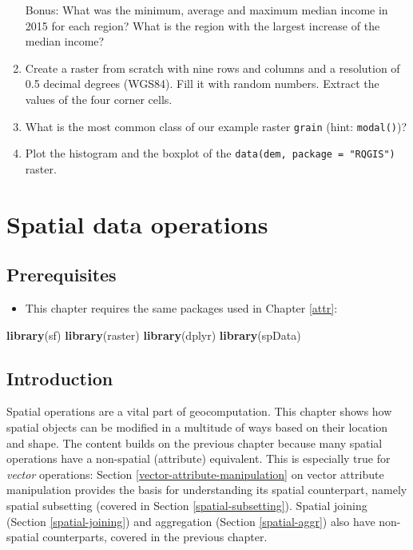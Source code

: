 \documentclass[]{krantz}
\newenvironment{Shaded}{\begin{snugshade}}{\end{snugshade}}
\newcommand{\KeywordTok}[1]{\textcolor[rgb]{0.27,0.27,0.27}{\textbf{#1}}}
\newcommand{\NormalTok}[1]{#1}
\providecommand{\tightlist}{%
  \setlength{\itemsep}{0pt}\setlength{\parskip}{0pt}}
\begin{document}
\begin{enumerate}
  Bonus: What was the minimum, average and maximum median income in 2015 for each region?
  What is the region with the largest increase of the median income?
\item
  Create a raster from scratch with nine rows and columns and a resolution of 0.5 decimal degrees (WGS84).
  Fill it with random numbers.
  Extract the values of the four corner cells.
\item
  What is the most common class of our example raster \texttt{grain} (hint: \texttt{modal()})?
\item
  Plot the histogram and the boxplot of the \texttt{data(dem,\ package\ =\ "RQGIS")} raster.
\end{enumerate}

\hypertarget{spatial-operations}{%
\section{Spatial data operations}\label{spatial-operations}}

\hypertarget{prerequisites-2}{%
\subsection*{Prerequisites}\label{prerequisites-2}}

\begin{itemize}
\tightlist
\item
  This chapter requires the same packages used in Chapter \ref{attr}:
\end{itemize}

\begin{Shaded}
\begin{Highlighting}[]
\KeywordTok{library}\NormalTok{(sf)}
\KeywordTok{library}\NormalTok{(raster)}
\KeywordTok{library}\NormalTok{(dplyr)}
\KeywordTok{library}\NormalTok{(spData)}
\end{Highlighting}
\end{Shaded}

\hypertarget{introduction-1}{%
\subsection{Introduction}\label{introduction-1}}

Spatial operations are a vital part of geocomputation.
This chapter shows how spatial objects can be modified in a multitude of ways based on their location and shape.
The content builds on the previous chapter because many spatial operations have a non-spatial (attribute) equivalent.
This is especially true for \emph{vector} operations: Section \ref{vector-attribute-manipulation} on vector attribute manipulation provides the basis for understanding its spatial counterpart, namely spatial subsetting (covered in Section \ref{spatial-subsetting}).
Spatial joining (Section \ref{spatial-joining}) and aggregation (Section \ref{spatial-aggr}) also have non-spatial counterparts, covered in the previous chapter.
\end{document}
